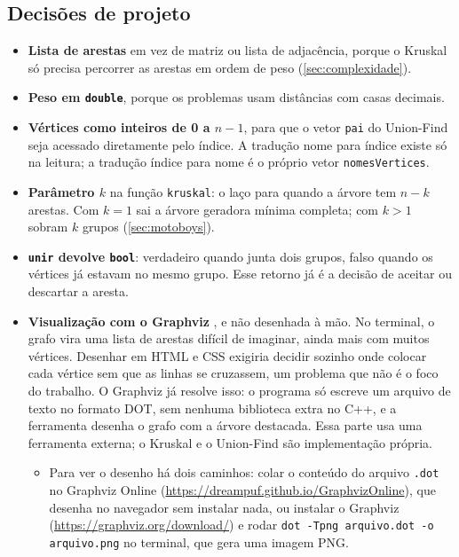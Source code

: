 \documentclass[a4paper]{article}
\begin{document}
\subsection{Decisões de projeto}\label{sec:decisoes}
\begin{itemize}
    \item \textbf{Lista de arestas} em vez de matriz ou lista de adjacência,
    porque o Kruskal só precisa percorrer as arestas em ordem de peso
    (\cref{sec:complexidade}).
    \item \textbf{Peso em \texttt{double}}, porque os problemas usam distâncias
    com casas decimais.
    \item \textbf{Vértices como inteiros de 0 a $n-1$}, para que o vetor
    \texttt{pai} do Union-Find seja acessado diretamente pelo índice. A tradução
    nome para índice existe só na leitura; a tradução índice para nome é o
    próprio vetor \texttt{nomesVertices}.
    \item \textbf{Parâmetro $k$} na função \texttt{kruskal}: o laço para quando a
    árvore tem $n-k$ arestas. Com $k = 1$ sai a árvore geradora mínima completa;
    com $k > 1$ sobram $k$ grupos (\cref{sec:motoboys}).
    \item \textbf{\texttt{unir} devolve \texttt{bool}}: verdadeiro quando junta
    dois grupos, falso quando os vértices já estavam no mesmo grupo. Esse retorno
    já é a decisão de aceitar ou descartar a aresta.
    \item \textbf{Visualização com o Graphviz} \cite{graphviz}, e não desenhada à
    mão. No terminal, o grafo vira uma lista de arestas difícil de imaginar, ainda
    mais com muitos vértices. Desenhar em HTML e CSS exigiria decidir sozinho onde
    colocar cada vértice sem que as linhas se cruzassem, um problema que não é o
    foco do trabalho. O Graphviz já resolve isso: o programa só escreve um
    arquivo de texto no formato DOT, sem nenhuma biblioteca extra no C++, e a
    ferramenta desenha o grafo com a árvore destacada. Essa parte usa uma
    ferramenta externa; o Kruskal e o Union-Find são implementação própria.
    \begin{itemize}
        \item Para ver o desenho há dois caminhos: colar o conteúdo do arquivo
        \texttt{.dot} no Graphviz Online
        (\url{https://dreampuf.github.io/GraphvizOnline}), que desenha no
        navegador sem instalar nada, ou instalar o Graphviz
        (\url{https://graphviz.org/download/}) e rodar
        \texttt{dot -Tpng arquivo.dot -o arquivo.png} no terminal, que gera uma
        imagem PNG.
    \end{itemize}
\end{itemize}
\end{document}
